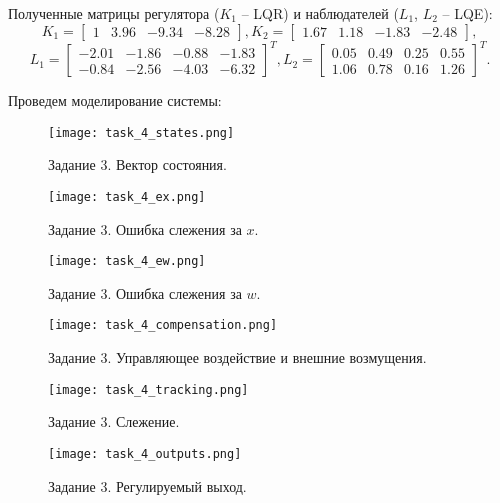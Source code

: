 Полученные матрицы регулятора ($K_1$ -- LQR) и наблюдателей ($L_1$, $L_2$ -- LQE):
\begin{equation*}
    K_1 = \begin{bmatrix}
        1 & 3.96 & -9.34 & -8.28
    \end{bmatrix},
    K_2 = \begin{bmatrix}
        1.67 & 1.18 & -1.83 & -2.48
    \end{bmatrix},
\end{equation*}
\begin{equation*}
    L_1 = \begin{bmatrix}
        -2.01 & -1.86 & -0.88 & -1.83 \\
        -0.84 & -2.56 & -4.03 & -6.32
    \end{bmatrix}^T,
    L_2 = \begin{bmatrix}
        0.05 & 0.49 & 0.25 & 0.55 \\
        1.06 & 0.78 & 0.16 & 1.26
    \end{bmatrix}^T.
\end{equation*}

Проведем моделирование системы:
\begin{figure}[]
    \centering
    \texttt{[image: task\_4\_states.png]}
    \caption{\label{fig:task4_3_2}Задание 3. Вектор состояния.}
\end{figure}
\begin{figure}[]
    \centering
    \texttt{[image: task\_4\_ex.png]}
    \caption{\label{fig:task4_3_2}Задание 3. Ошибка слежения за $x$.}
\end{figure}
\begin{figure}[]
    \centering
    \texttt{[image: task\_4\_ew.png]}
    \caption{\label{fig:task4_3_2}Задание 3. Ошибка слежения за $w$.}
\end{figure}

\begin{figure}[]
    \centering
    \texttt{[image: task\_4\_compensation.png]}
    \caption{\label{fig:task4_3_2}Задание 3. Управляющее воздействие и внешние возмущения.}
\end{figure}

\begin{figure}[]
    \centering
    \texttt{[image: task\_4\_tracking.png]}
    \caption{\label{fig:task4_3_2}Задание 3. Слежение.}
\end{figure}

\begin{figure}[]
    \centering
    \texttt{[image: task\_4\_outputs.png]}
    \caption{\label{fig:task4_3_2}Задание 3. Регулируемый выход.}
\end{figure}

